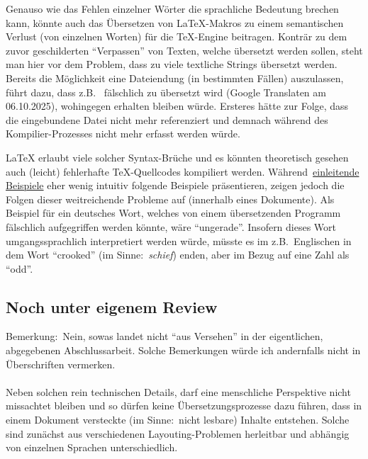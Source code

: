 \label{einleitung:inclusion}
Genauso wie das Fehlen einzelner Wörter die sprachliche Bedeutung brechen kann, könnte auch das Übersetzen von \LaTeX{}-Makros zu einem semantischen Verlust (von einzelnen Worten) für die \TeX{}-Engine beitragen. Konträr zu dem zuvor geschilderten \enquote{Verpassen} von Texten, welche übersetzt werden sollen, steht man hier vor dem Problem, dass zu viele textliche Strings übersetzt werden. Bereits die Möglichkeit eine Dateiendung (in bestimmten Fällen) auszulassen, führt dazu, dass z.B.\ \verb|| fälschlich zu \verb|| übersetzt wird (Google Translaten am 06.10.2025), wohingegen \verb|| erhalten bleiben würde. Ersteres hätte zur Folge, dass die eingebundene Datei nicht mehr referenziert und demnach während des Kompilier-Prozesses nicht mehr erfasst werden würde.\\\noindent 

\LaTeX{} erlaubt viele solcher Syntax-Brüche und es könnten theoretisch gesehen auch (leicht) fehlerhafte \TeX{}-Quellcodes kompiliert werden. Während~\hyperref[einleitung:hintergrund]{einleitende Beispiele} eher wenig intuitiv folgende Beispiele präsentieren, zeigen jedoch die Folgen dieser weitreichende Probleme auf (innerhalb eines Dokumente). Als Beispiel für ein deutsches Wort, welches von einem übersetzenden Programm fälschlich aufgegriffen werden könnte, wäre \enquote{ungerade}. Insofern dieses Wort umgangssprachlich interpretiert werden würde, müsste es im z.B.\ Englischen in dem Wort \enquote{crooked} (im Sinne:\ \textit{schief}) enden, aber im Bezug auf eine Zahl als \enquote{odd}.\\\noindent


\subsection{Noch unter eigenem Review}
Bemerkung:\ Nein, sowas landet nicht \enquote{aus Versehen} in der eigentlichen, abgegebenen Abschlussarbeit. Solche Bemerkungen würde ich andernfalls nicht in Überschriften vermerken.\\\\

Neben solchen rein technischen Details, darf eine menschliche Perspektive nicht missachtet bleiben und so dürfen keine Übersetzungsprozesse dazu führen, dass in einem Dokument versteckte (im Sinne:\ nicht lesbare) Inhalte entstehen. Solche sind zunächst aus verschiedenen Layouting-Problemen herleitbar und abhängig von einzelnen Sprachen unterschiedlich. 


